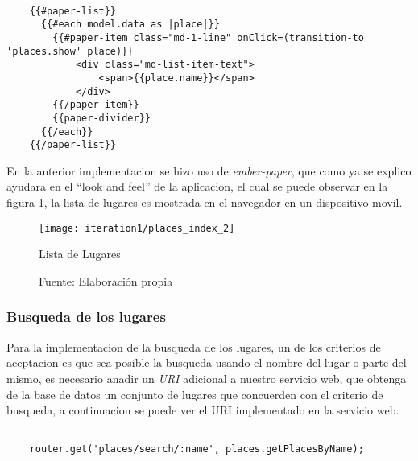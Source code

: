\begin{center}
  \begin{lstlisting}[label=template_places_index,caption=Template de la lista de lugares]

    {{#paper-list}}
      {{#each model.data as |place|}}
        {{#paper-item class="md-1-line" onClick=(transition-to 'places.show' place)}}
            <div class="md-list-item-text">
                <span>{{place.name}}</span>
            </div>
        {{/paper-item}}
        {{paper-divider}}
      {{/each}}
    {{/paper-list}}

  \end{lstlisting}
\end{center}

En la anterior implementacion se hizo uso de \emph{ember-paper}, que como ya se explico ayudara en el ``look and feel'' de la aplicacion, el cual se puede observar en la figura \ref{fig:places_index}, la lista de lugares es mostrada en el navegador en un dispositivo movil.


\begin{figure}[H]
  \begin{center}
    \texttt{[image: iteration1/places\_index\_2]}
    \caption{Lista de Lugares}
    \label{fig:places_index}
    \caption*{Fuente: Elaboración propia}
  \end{center}
\end{figure}


\subsubsection{Busqueda de los lugares}
\label{subs:busqueda de los lugares}

Para la implementacion de la busqueda de los lugares, un de los criterios de aceptacion es que sea posible la busqueda usando el nombre del lugar o parte del mismo, es necesario anadir un \emph{URI} adicional a nuestro servicio web, que obtenga de la base de datos un conjunto de lugares que concuerden con el criterio de busqueda, a continuacion se puede ver el URI implementado en la servicio web. \\

\begin{center}
  \begin{lstlisting}[label=endpoint_search_place,caption=Implementacion de la busqueda de lugares en el Servicio Web]

    router.get('places/search/:name', places.getPlacesByName);

  \end{lstlisting}
\end{center}


